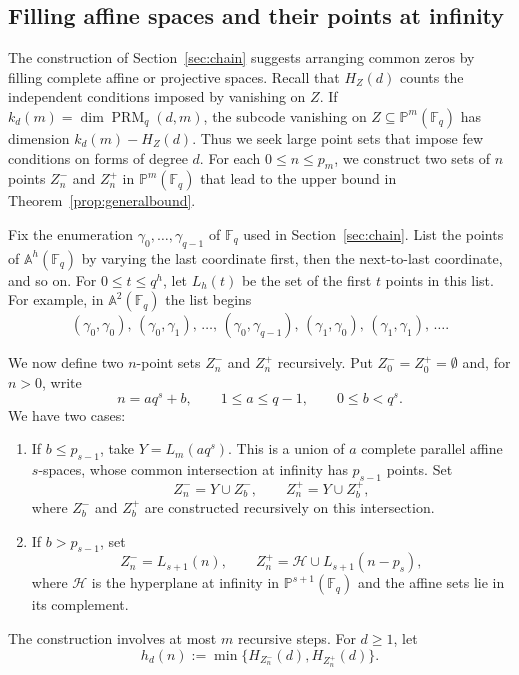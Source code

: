 \documentclass[11pt]{amsart}
\theoremstyle{definition}
\newcommand{\F}{\mathbb F}
\newcommand{\PP}{\mathbb P}
\newcommand{\Aff}{\mathbb A}
\newcommand{\PRM}{\operatorname{PRM}}
\numberwithin{equation}{section}
\begin{document}
\subsection{Filling affine spaces and their points at infinity}

The construction of Section~\ref{sec:chain} suggests arranging
common zeros by filling complete affine or projective spaces.
Recall that $H_Z(d)$ counts the independent conditions imposed by
vanishing on $Z$. If $k_d(m)=\dim\PRM_q(d,m)$, the subcode
vanishing on $Z\subseteq\PP^m(\F_q)$ has dimension
$k_d(m)-H_Z(d)$. Thus we seek large point sets that impose few
conditions on forms of degree $d$. 
For each $0\le n\le p_m$, we construct two sets of $n$ points
$Z_n^-$ and $Z_n^+$ in $\PP^m(\F_q)$ that lead to the
upper bound in Theorem~\ref{prop:generalbound}.


Fix the enumeration $\gamma_0,\ldots,\gamma_{q-1}$ of $\F_q$
used in Section~\ref{sec:chain}. List the points of
$\Aff^h(\F_q)$ by varying the last coordinate first, then the
next-to-last coordinate, and so on. For $0\le t\le q^h$, let
$L_h(t)$ be the set of the first $t$ points in this list.
For example, in $\Aff^2(\F_q)$ the list begins
\[
 (\gamma_0,\gamma_0),\,
 (\gamma_0,\gamma_1),\,\ldots,\,
 (\gamma_0,\gamma_{q-1}),\,
 (\gamma_1,\gamma_0),\,
 (\gamma_1,\gamma_1),\,\ldots.
\]

We now define two $n$-point sets $Z_n^-$ and $Z_n^+$
recursively. Put $Z_0^-=Z_0^+=\emptyset$ and, for $n>0$, write
\begin{equation}\label{eq:canonicaldigits}
 n=aq^s+b,\qquad 1\le a\le q-1,\qquad 0\le b<q^s.
\end{equation}
We have two cases:
\begin{enumerate}[label=\textup{(\roman*)}]
\item If $b\le p_{s-1}$, take $Y=L_m(aq^s)$.
      This is a union of $a$ complete parallel affine
      $s$-spaces, whose common intersection at infinity
      has $p_{s-1}$ points. Set
      \[
       Z_n^-=Y\cup Z_b^-,
       \qquad
       Z_n^+=Y\cup Z_b^+,
      \]
      where $Z_b^-$ and $Z_b^+$ are constructed recursively
      on this intersection.
\item If $b>p_{s-1}$, set
      \begin{equation}\label{eq:canonicalterminal}
       Z_n^-=L_{s+1}(n),\qquad
       Z_n^+=\mathcal H\cup L_{s+1}(n-p_s),
      \end{equation}
      where $\mathcal H$ is the hyperplane at infinity in
      $\PP^{s+1}(\F_q)$ and the affine sets lie in its complement.
\end{enumerate}
The construction involves at most $m$ recursive steps.
For $d\ge1$, let
\[
 h_d(n):=\min\{H_{Z_n^-}(d),H_{Z_n^+}(d)\}.
\]
\end{document}
